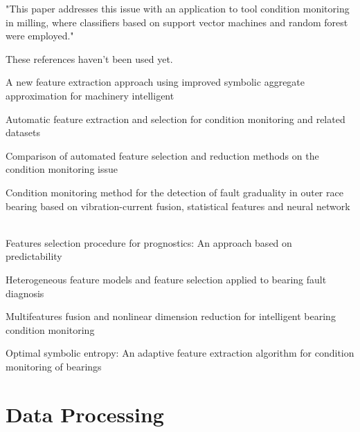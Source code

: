 \documentclass[]{article}
\begin{document}
"This paper addresses this issue with an application to tool condition monitoring in
milling, where classifiers based on support vector machines and random forest were employed."~\cite{assafo2023stability}





These references haven't been used yet.

A new feature extraction approach using improved symbolic aggregate approximation for machinery intelligent ~\cite{zhang2019new}

Automatic feature extraction and selection for condition monitoring and related datasets ~\cite{schneider2018automatic}

Comparison of automated feature selection and reduction methods on the condition monitoring issue ~\cite{de2018comparison}

Condition monitoring method for the detection of fault graduality in outer race bearing based on vibration-current fusion, statistical features and neural network ~\cite{saucedo2021condition}

Features selection procedure for prognostics: An approach based on predictability~\cite{javed2012features}

Heterogeneous feature models and feature selection applied to bearing fault diagnosis~\cite{rauber2014heterogeneous}

Multifeatures fusion and nonlinear dimension reduction for intelligent bearing condition monitoring~\cite{guo2016multifeatures}

Optimal symbolic entropy: An adaptive feature extraction algorithm for condition monitoring of bearings~\cite{li2023optimal}



\clearpage  
\section{Data Processing}
\end{document}

